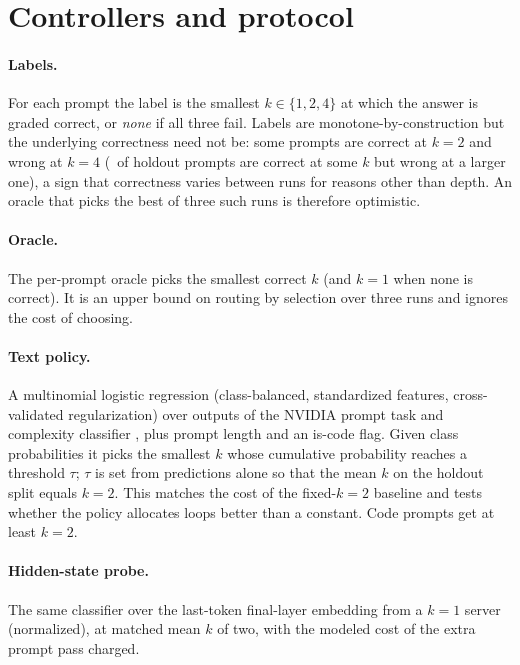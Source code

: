 \documentclass[11pt]{article}
\newcommand{\kk}[1]{$k{=}#1$}
\begin{document}
\section{Controllers and protocol}
\label{sec:protocol}
\paragraph{Labels.}
For each prompt the label is the smallest $k\in\{1,2,4\}$ at which the answer is graded correct, or \emph{none} if all three fail. Labels are monotone-by-construction but the underlying correctness need not be: some prompts are correct at $k{=}2$ and wrong at $k{=}4$ (\HoldoutNonMonoRate\ of holdout prompts are correct at some $k$ but wrong at a larger one), a sign that correctness varies between runs for reasons other than depth. An oracle that picks the best of three such runs is therefore optimistic.

\paragraph{Oracle.}
The per-prompt oracle picks the smallest correct $k$ (and $k{=}1$ when none is correct). It is an upper bound on routing by selection over three runs and ignores the cost of choosing.

\paragraph{Text policy.}
A multinomial logistic regression (class-balanced, standardized features, cross-validated regularization) over outputs of the NVIDIA prompt task and complexity classifier \citep{nvclassifier}, plus prompt length and an is-code flag. Given class probabilities it picks the smallest $k$ whose cumulative probability reaches a threshold $\tau$; $\tau$ is set from predictions alone so that the mean $k$ on the holdout split equals \kk{2}. This matches the cost of the fixed-$k{=}2$ baseline and tests whether the policy allocates loops better than a constant. Code prompts get at least $k{=}2$.

\paragraph{Hidden-state probe.}
The same classifier over the last-token final-layer embedding from a $k{=}1$ server (normalized), at matched mean $k$ of two, with the modeled cost of the extra prompt pass charged.
\end{document}
